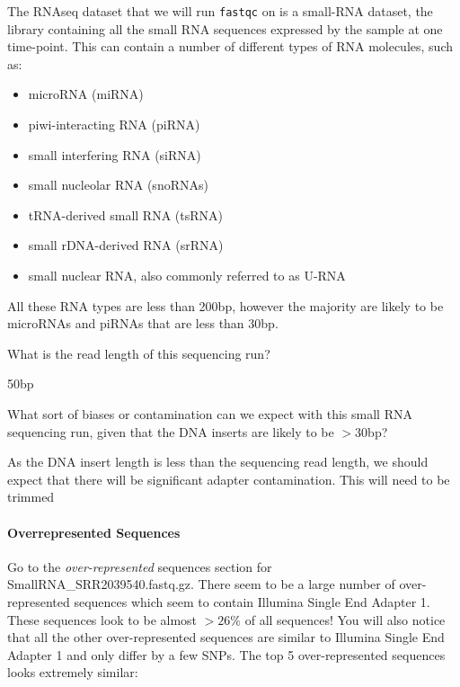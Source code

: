 The RNAseq dataset that we will run \texttt{fastqc} on is a small-RNA dataset, the library containing all the small RNA sequences expressed by the sample at one time-point. This can contain a number of different types of RNA molecules, such as:
\begin{itemize}
\item microRNA (miRNA)
\item piwi-interacting RNA (piRNA)
\item small interfering RNA (siRNA)
\item small nucleolar RNA (snoRNAs)
\item tRNA-derived small RNA (tsRNA)
\item small rDNA-derived RNA (srRNA)
\item small nuclear RNA, also commonly referred to as U-RNA
\end{itemize}

All these RNA types are less than 200bp, however the majority are likely to be microRNAs and piRNAs that are less than 30bp.

\begin{questions}
What is the read length of this sequencing run? \\
\begin{answer}
50bp \\
\end{answer}
What sort of biases or contamination can we expect with this small RNA sequencing run, given that the DNA inserts are likely to be $>30$bp? \\
\begin{answer}
As the DNA insert length is less than the sequencing read length, we should expect that there will be significant adapter contamination. This will need to be trimmed
\end{answer}
\end{questions}

\paragraph{Overrepresented Sequences}
Go to the \textit{over-represented} sequences section for SmallRNA_SRR2039540.fastq.gz.
There seem to be a large number of over-represented sequences which seem to contain Illumina Single End Adapter 1. These sequences look to be almost $>26$\% of all sequences! You will also notice that all the other over-represented sequences are similar to Illumina Single End Adapter 1 and only differ by a few SNPs. The top 5 over-represented sequences looks extremely similar: \\


